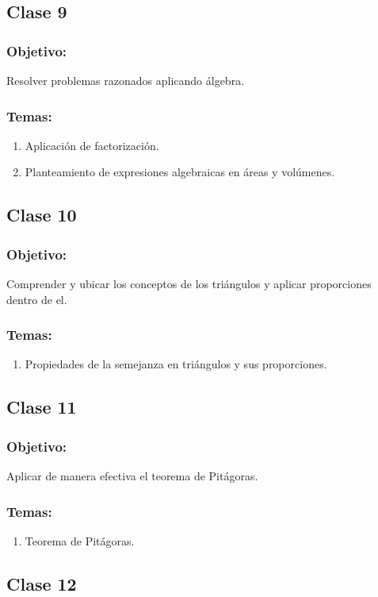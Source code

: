\documentclass[12pt,letterpaper]{report}
\begin{document}
\subsection*{Clase 9}
\subsubsection*{Objetivo:}
Resolver problemas razonados aplicando álgebra.
\subsubsection*{Temas:}
\begin{enumerate}
    \item Aplicación de factorización.
    \item Planteamiento de expresiones algebraicas en áreas y volúmenes.
\end{enumerate}
\subsection*{Clase 10}
\subsubsection*{Objetivo:}
Comprender y ubicar los conceptos de los triángulos y aplicar proporciones dentro de el.
\subsubsection*{Temas:}
\begin{enumerate}
    \item Propiedades de la semejanza en triángulos y sus proporciones.
\end{enumerate}
\subsection*{Clase 11}
\subsubsection*{Objetivo:}
Aplicar de manera efectiva el teorema de Pitágoras.
\subsubsection*{Temas:}
\begin{enumerate}
    \item Teorema de Pitágoras.
\end{enumerate}
\subsection*{Clase 12}
\end{document}
